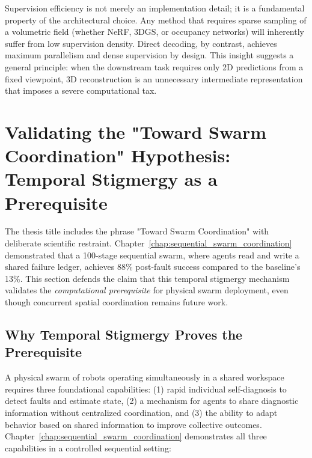 \documentclass[12pt,a4paper,oneside]{report}
\begin{document}
Supervision efficiency is not merely an implementation detail; it is a fundamental property of the architectural choice. Any method that requires sparse sampling of a volumetric field (whether NeRF, 3DGS, or occupancy networks) will inherently suffer from low supervision density. Direct decoding, by contrast, achieves maximum parallelism and dense supervision by design. This insight suggests a general principle: when the downstream task requires only 2D predictions from a fixed viewpoint, 3D reconstruction is an unnecessary intermediate representation that imposes a severe computational tax.

\section{Validating the "Toward Swarm Coordination" Hypothesis: Temporal Stigmergy as a Prerequisite}

The thesis title includes the phrase "Toward Swarm Coordination" with deliberate scientific restraint. Chapter~\ref{chap:sequential_swarm_coordination} demonstrated that a 100-stage sequential swarm, where agents read and write a shared failure ledger, achieves 88\% post-fault success compared to the baseline's 13\%. This section defends the claim that this temporal stigmergy mechanism validates the \textit{computational prerequisite} for physical swarm deployment, even though concurrent spatial coordination remains future work.

\subsection{Why Temporal Stigmergy Proves the Prerequisite}
\label{subsec:why_temporal_stigmergy_proves_the_prerequisite_1}

A physical swarm of robots operating simultaneously in a shared workspace requires three foundational capabilities: (1) rapid individual self-diagnosis to detect faults and estimate state, (2) a mechanism for agents to share diagnostic information without centralized coordination, and (3) the ability to adapt behavior based on shared information to improve collective outcomes. Chapter~\ref{chap:sequential_swarm_coordination} demonstrates all three capabilities in a controlled sequential setting:
\end{document}
